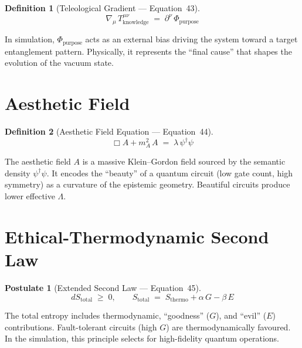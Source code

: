 \documentclass[11pt,a4paper]{article}
\newtheorem{postulate}{Postulate}
\newtheorem{definition}{Definition}[section]
\theoremstyle{remark}
\begin{document}
\begin{definition}[Teleological Gradient --- Equation~43]
\begin{equation}\label{eq:teleo}
    \nabla_\mu\, T^{\mu\nu}_{\text{knowledge}} \;=\; \partial^\nu\,\Phi_{\text{purpose}}
\end{equation}
\end{definition}

In simulation, $\Phi_{\text{purpose}}$ acts as an external bias driving the system toward a target entanglement pattern.  Physically, it represents the ``final cause'' that shapes the evolution of the vacuum state.

\section{Aesthetic Field}
\label{sec:eq44}

\begin{definition}[Aesthetic Field Equation --- Equation~44]
\begin{equation}\label{eq:aesthetic}
    \Box A + m_A^2\, A \;=\; \lambda\,\psi^\dagger\psi
\end{equation}
\end{definition}

The aesthetic field $A$ is a massive Klein--Gordon field sourced by the semantic density $\psi^\dagger\psi$.  It encodes the ``beauty'' of a quantum circuit (low gate count, high symmetry) as a curvature of the epistemic geometry.  Beautiful circuits produce lower effective $\Lambda$.

\section{Ethical-Thermodynamic Second Law}
\label{sec:eq45}

\begin{postulate}[Extended Second Law --- Equation~45]
\begin{equation}\label{eq:ethical}
    dS_{\text{total}} \;\geq\; 0, \qquad
    S_{\text{total}} \;=\; S_{\text{thermo}} + \alpha\, G - \beta\, E
\end{equation}
\end{postulate}

The total entropy includes thermodynamic, ``goodness'' ($G$), and ``evil'' ($E$) contributions.  Fault-tolerant circuits (high $G$) are thermodynamically favoured.  In the simulation, this principle selects for high-fidelity quantum operations.
\end{document}

